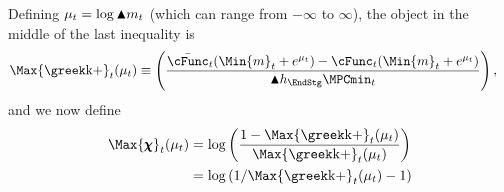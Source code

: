   Defining $\mu_{t} =
  \log \blacktriangle m_{t}$ (which can range from $-\infty$ to $\infty$), the object in the middle of the last inequality is
  \begin{equation}\begin{gathered}\begin{aligned}
        \Max{\koppa}_{\prd}(\mu_{\prd})   & \equiv  \left(\frac{\bar{\cFunc}_{\prd}(\Min{m}_{\prd}+e^{\mu_{\prd}})-\cFunc_{\prd}(\Min{m}_{\prd}+e^{\mu_{\prd}})}{\aboveMin \hNrm_{\EndStg} \MPCmin_{\prd}}\right), \label{eq:koppa}
      \end{aligned}\end{gathered}\end{equation}
  and we now define
  \begin{equation}\begin{gathered}\begin{aligned}
        \Max{\chiFunc}_{\prd}(\mu_{\prd})  & = \log \left(\frac{1-\Max{\koppa}_{\prd}(\mu_{\prd})}{\Max{\koppa}_{\prd}(\mu_{\prd})}\right)
        \\  & = \log \left(1/\Max{\koppa}_{\prd}(\mu_{\prd})-1\right) \label{eq:chi}
      \end{aligned}\end{gathered}\end{equation}
